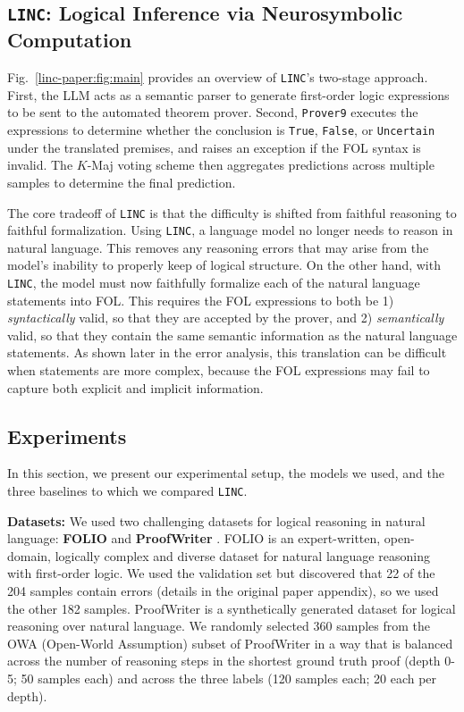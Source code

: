 \subsection{\texttt{LINC}: Logical Inference via Neurosymbolic Computation}
\label{linc-paper:sec:ns-model}

Fig.~\ref{linc-paper:fig:main} provides an overview of \texttt{LINC}'s two-stage approach.
First, the LLM acts as a semantic parser to generate first-order logic expressions to be sent to the automated theorem prover.
Second, \texttt{Prover9} \citep{prover9-mace4} executes the expressions to determine whether the conclusion is \texttt{True},
\texttt{False}, or \texttt{Uncertain} under the translated premises, and raises an exception if the FOL syntax is
invalid. The $K$-Maj voting scheme then aggregates predictions across multiple samples to determine the final prediction.

The core tradeoff of \texttt{LINC} is that the difficulty is shifted from faithful reasoning to faithful formalization.
Using \texttt{LINC}, a language model no longer needs to reason in natural language. This
removes any reasoning errors that may arise from the model's inability to properly keep
of logical structure. On the other hand, with \texttt{LINC}, the model must now faithfully formalize
each of the natural language statements into FOL. This requires the FOL expressions to both be 1) \textit{syntactically}
valid, so that they are accepted by the prover, and 2) \textit{semantically} valid, so that they contain the same semantic information
as the natural language statements. As shown later in the error analysis, this translation can be difficult when statements are more complex,
because the FOL expressions may fail to capture both explicit and implicit information.

\subsection{Experiments}\label{linc-paper:sec:experiments}
In this section, we present our experimental setup, the models we used, and the three baselines to which we compared \texttt{LINC}.

\textbf{Datasets:} We used two challenging datasets for logical reasoning in natural language: \textbf{FOLIO} \cite{han2022folio} and \textbf{ProofWriter} \cite{tafjord2021proofwriter}.
FOLIO is an expert-written, open-domain, logically complex and diverse dataset for natural
language reasoning with first-order logic. We used the validation set but discovered that 22 of the 204 samples contain errors
(details in the original paper appendix), so we used the other 182 samples.
ProofWriter is a synthetically generated dataset for logical reasoning over natural language.
We randomly selected 360 samples from the OWA (Open-World Assumption) subset of ProofWriter in
a way that is balanced across the number of reasoning steps in the shortest ground truth proof
(depth 0-5; 50 samples each) and across the three labels (120 samples each; 20 each per depth).

